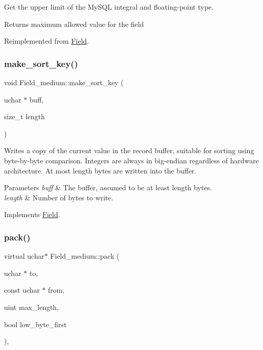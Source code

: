 Get the upper limit of the My\+S\+QL integral and floating-\/point type.

\begin{DoxyReturn}{Returns}
maximum allowed value for the field 
\end{DoxyReturn}


Reimplemented from \mbox{\hyperlink{classField_a22f18fbe3224a5ac4f23a90523b09087}{Field}}.

\mbox{\label{classField__medium_a4a1a61100d554bba90a37139c41b7e6f}} 
\subsubsection{\texorpdfstring{make\+\_\+sort\+\_\+key()}{make\_sort\_key()}}
{\footnotesize\ttfamily void Field\+\_\+medium\+::make\+\_\+sort\+\_\+key (\begin{DoxyParamCaption}\item[{uchar $\ast$}]{buff,  }\item[{size\+\_\+t}]{length }\end{DoxyParamCaption})\hspace{0.3cm}{\ttfamily [virtual]}}

Writes a copy of the current value in the record buffer, suitable for sorting using byte-\/by-\/byte comparison. Integers are always in big-\/endian regardless of hardware architecture. At most length bytes are written into the buffer.


\begin{DoxyParams}{Parameters}
{\em buff} & The buffer, assumed to be at least length bytes.\\
\hline
{\em length} & Number of bytes to write. \\
\hline
\end{DoxyParams}


Implements \mbox{\hyperlink{classField_af3bc27d237b6ae6ef3dc7a2aec3d79ac}{Field}}.

\mbox{\label{classField__medium_a1c93838ae85a69a18a5d3e88da916369}} 
\subsubsection{\texorpdfstring{pack()}{pack()}}
{\footnotesize\ttfamily virtual uchar$\ast$ Field\+\_\+medium\+::pack (\begin{DoxyParamCaption}\item[{uchar $\ast$}]{to,  }\item[{const uchar $\ast$}]{from,  }\item[{uint}]{max\+\_\+length,  }\item[{bool}]{low\+\_\+byte\+\_\+first }\end{DoxyParamCaption})\hspace{0.3cm}{\ttfamily [inline]}, {\ttfamily [virtual]}}


